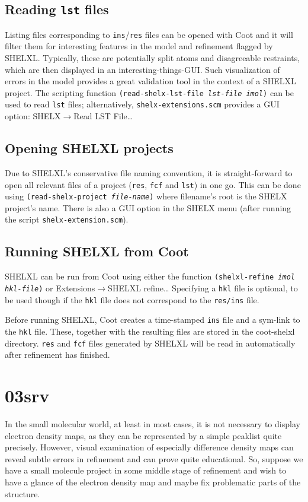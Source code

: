 \documentclass{article}
\begin{document}
\subsection{Reading \texttt{lst} files}
Listing files corresponding to \texttt{ins}/\texttt{res} files can be opened with Coot and it will filter them for interesting features in the model and refinement flagged by SHELXL. Typically, these are potentially split atoms and disagreeable restraints, which are then displayed in an interesting-things-GUI. Such visualization of errors in the model provides a great validation tool in the context of a SHELXL project. The scripting function \texttt{(read-shelx-lst-file \emph{lst-file imol})} can be used to read \texttt{lst} files; alternatively, \texttt{shelx-extensions.scm} provides a GUI option: \textsf{SHELX$\to$Read LST File\ldots}

\subsection{Opening SHELXL projects} 
Due to SHELXL's conservative file naming convention, it is straight-forward to open all relevant files of a project (\texttt{res}, \texttt{fcf} and \texttt{lst}) in one go. This can be done using \texttt{(read-shelx-project \emph{file-name})} where filename's root is the SHELX project's name. There is also a GUI option in the SHELX menu (after running the script \texttt{shelx-extension.scm}).

\subsection{Running SHELXL from Coot}
SHELXL can be run from Coot using either the function \texttt{(shelxl-refine \emph{imol hkl-file})} or \textsf{Extensions$\to$SHELXL refine\ldots} Specifying a \texttt{hkl} file is optional, to be used though if the \texttt{hkl} file does not correspond to the \texttt{res/ins} file.

Before running SHELXL, Coot creates a time-stamped \texttt{ins} file and a sym-link to the \texttt{hkl} file. These, together with the resulting files are stored in the coot-shelxl directory. \texttt{res} and \texttt{fcf} files generated by SHELXL will be read in automatically after refinement has finished.


\section{03srv}
In the small molecular world, at least in most cases, it is not necessary to display electron density maps, as they can be represented by a simple peaklist quite precisely. However, visual examination of especially difference density maps can reveal subtle errors in refinement and can prove quite educational. So, suppose we have a small molecule project in some middle stage of refinement and wish to have a glance of the electron density map and maybe fix problematic parts of the structure.
\end{document}
